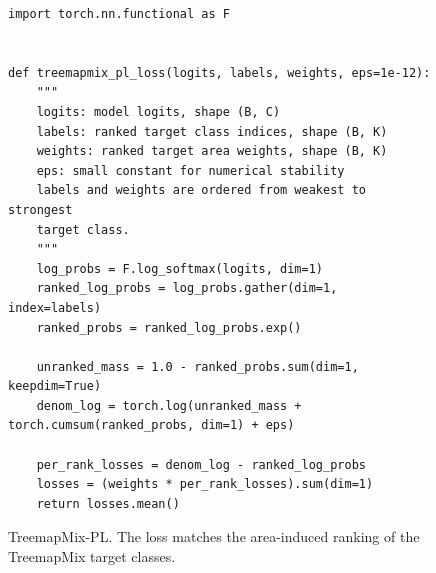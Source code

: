 \begin{figure}[t]
\centering
\footnotesize
\begin{verbatim}
import torch.nn.functional as F


def treemapmix_pl_loss(logits, labels, weights, eps=1e-12):
    """
    logits: model logits, shape (B, C)
    labels: ranked target class indices, shape (B, K)
    weights: ranked target area weights, shape (B, K)
    eps: small constant for numerical stability
    labels and weights are ordered from weakest to strongest
    target class.
    """
    log_probs = F.log_softmax(logits, dim=1)
    ranked_log_probs = log_probs.gather(dim=1, index=labels)
    ranked_probs = ranked_log_probs.exp()

    unranked_mass = 1.0 - ranked_probs.sum(dim=1, keepdim=True)
    denom_log = torch.log(unranked_mass + torch.cumsum(ranked_probs, dim=1) + eps)

    per_rank_losses = denom_log - ranked_log_probs
    losses = (weights * per_rank_losses).sum(dim=1)
    return losses.mean()
\end{verbatim}
\caption{TreemapMix-PL. The loss matches the area-induced ranking of the TreemapMix target classes.}
\label{fig:treemapmix-pl-code}
\end{figure}